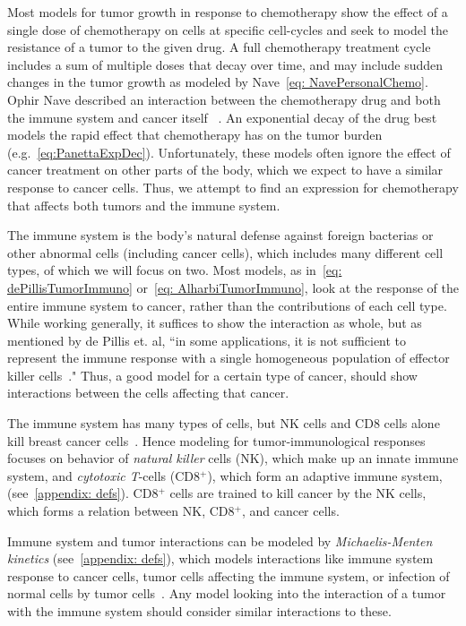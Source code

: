 \documentclass[11pt]{amsart}
\begin{document}
Most models for tumor growth in response to chemotherapy show the effect of a single dose of chemotherapy on cells at specific cell-cycles and seek to model the resistance of a tumor to the given drug.
A full chemotherapy treatment cycle includes a sum of multiple doses that decay over time, and may include sudden changes in the tumor growth as modeled by Nave\ \eqref{eq: NavePersonalChemo}.
Ophir Nave described an interaction between the chemotherapy drug and both the immune system and cancer itself \ \cite{NAVE2022e09288}.
An exponential decay of the drug best models the rapid effect that chemotherapy has on the tumor burden (e.g.\ \eqref{eq:PanettaExpDec}).
Unfortunately, these models often ignore the effect of cancer treatment on other parts of the body, which we expect to have a similar response to cancer cells.
Thus, we attempt to find an expression for chemotherapy that affects both tumors and the immune system.

The immune system is the body's natural defense against foreign bacterias or other abnormal cells (including cancer cells), which includes many different cell types, of which we will focus on two.
Most models, as in\ \ref{eq: dePillisTumorImmuno} or\ \ref{eq: AlharbiTumorImmuno}, look at the response of the entire immune system to cancer, rather than the contributions of each cell type.
While working generally, it suffices to show the interaction as whole, but as mentioned by de Pillis et. al, ``in some applications, it is not sufficient to represent the immune response with a single homogeneous population of effector killer cells\ \cite{dePillis2014461}."
Thus, a good model for a certain type of cancer, should show interactions between the cells affecting that cancer.

The immune system has many types of cells, but NK cells and CD8 cells alone kill breast cancer cells\ \cite{Amens21}.
Hence modeling for tumor-immunological responses focuses on behavior of \textit{natural killer} cells (NK), which make up an innate immune system, and \textit{cytotoxic T}-cells (CD8$^+$), which form an adaptive immune system, (see\ \ref{appendix: defs}).
CD8$^+$ cells are trained to kill cancer by the NK cells, which forms a relation between NK, CD8$^+$, and cancer cells.

Immune system and tumor interactions can be modeled by \textit{Michaelis-Menten kinetics} (see\ \ref{appendix: defs}), which models interactions like immune system response to cancer cells, tumor cells affecting the immune system, or infection of normal cells by tumor cells\  \cite{math8081285}.
Any model looking into the interaction of a tumor with the immune system should consider similar interactions to these.
\end{document}
